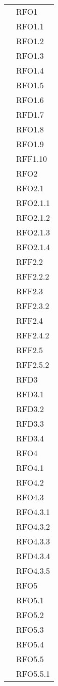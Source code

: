 \begin{longtable}{ p{12cm} | p{4cm} }
		    & RFO1 \\
		    & RFO1.1 \\
		    & RFO1.2 \\
		    & RFO1.3 \\
		    & RFO1.4 \\
		    & RFO1.5 \\
		    & RFO1.6 \\
		    & RFD1.7 \\
		    & RFO1.8 \\
		    & RFO1.9 \\
		    & RFF1.10 \\
		    & RFO2 \\
		    & RFO2.1 \\
		    & RFO2.1.1 \\
		    & RFO2.1.2 \\
		    & RFO2.1.3 \\
		    & RFO2.1.4 \\
		    & RFF2.2 \\
		    & RFF2.2.2 \\
		    & RFF2.3 \\
		    & RFF2.3.2 \\
		    & RFF2.4 \\
		    & RFF2.4.2 \\
		    & RFF2.5 \\
		    & RFF2.5.2 \\
		     & RFD3 \\
		    & RFD3.1 \\
		    & RFD3.2 \\
		    & RFD3.3 \\
		    & RFD3.4 \\
		    & RFO4 \\
		    & RFO4.1 \\
		    & RFO4.2 \\
		    & RFO4.3 \\
		    & RFO4.3.1 \\
		    & RFO4.3.2 \\
		    & RFO4.3.3 \\
		    & RFD4.3.4 \\
		    & RFO4.3.5 \\
		    & RFO5 \\
& RFO5.1 \\
& RFO5.2 \\
& RFO5.3 \\
& RFO5.4 \\
& RFO5.5 \\
& RFO5.5.1 \\

\end{longtable}

